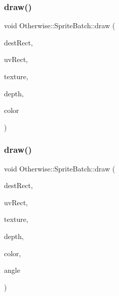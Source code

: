 \subsubsection{\texorpdfstring{draw()}{draw()}\hspace{0.1cm}{\footnotesize\ttfamily [1/3]}}
{\footnotesize\ttfamily void Otherwise\+::\+Sprite\+Batch\+::draw (\begin{DoxyParamCaption}\item[{const glm\+::vec4 \&}]{dest\+Rect,  }\item[{const glm\+::vec4 \&}]{uv\+Rect,  }\item[{G\+Luint}]{texture,  }\item[{float}]{depth,  }\item[{const \hyperlink{struct_otherwise_1_1_color_r_g_b_a8}{Color\+R\+G\+B\+A8} \&}]{color }\end{DoxyParamCaption})}

\mbox{\label{class_otherwise_1_1_sprite_batch_a87d88f02c722962bf001029bfbcc5865}} 
\subsubsection{\texorpdfstring{draw()}{draw()}\hspace{0.1cm}{\footnotesize\ttfamily [2/3]}}
{\footnotesize\ttfamily void Otherwise\+::\+Sprite\+Batch\+::draw (\begin{DoxyParamCaption}\item[{const glm\+::vec4 \&}]{dest\+Rect,  }\item[{const glm\+::vec4 \&}]{uv\+Rect,  }\item[{G\+Luint}]{texture,  }\item[{float}]{depth,  }\item[{const \hyperlink{struct_otherwise_1_1_color_r_g_b_a8}{Color\+R\+G\+B\+A8} \&}]{color,  }\item[{float}]{angle }\end{DoxyParamCaption})}

\mbox{\label{class_otherwise_1_1_sprite_batch_ad64d1d168e2da81e72852685aba464f8}} 

